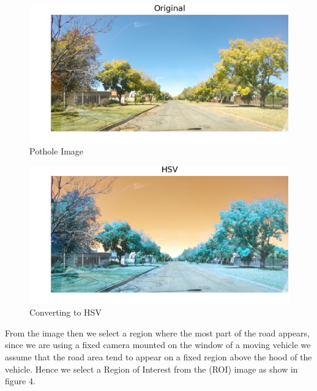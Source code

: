 \documentclass[journal]{IEEEtran}
\begin{document}
\begin{figure}[!htb]
\begin{center}
\includegraphics[scale=1]{Images/0_Original.png}
\end{center}
\caption{Pothole Image}
\end{figure}


\begin{figure}[!htb]
\begin{center}
\includegraphics[scale=1]{Images/1_HSV.png}
\end{center}
\caption{Converting to HSV}
\end{figure}

From the image then we select a region where the most part of the road appears, since we are using a fixed camera mounted on the window of a moving vehicle we assume that the road area tend to appear on a fixed region above the hood of the vehicle. Hence we select a Region of Interest from the (ROI) image as show in figure 4.
\end{document}
